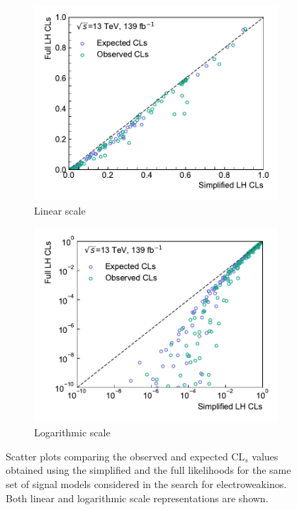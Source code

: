 \begin{figure}
	\centering
	\begin{subfigure}[b]{0.5\textwidth}
		\centering\includegraphics[width=\textwidth]{cls_scatter_1Lbb_lin}
		\caption{Linear scale}
	\end{subfigure}\hfill
	\begin{subfigure}[b]{0.5\textwidth}
		\centering\includegraphics[width=\textwidth]{cls_scatter_1Lbb_log}
		\caption{Logarithmic scale}
	\end{subfigure}
	\caption{Scatter plots comparing the observed and expected CL$_s$ values obtained using the simplified and the full likelihoods for the same set of signal models considered in the search for electroweakinos. Both linear and logarithmic scale representations are shown.}\label{fig:scatter_cls}
\end{figure}





